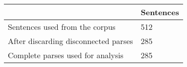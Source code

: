 	\begin{tabular}{|l|l|}
		\hline
	 & Sentences \\ 
		\hline
		Sentences used from the corpus & 512\\ 
		\hline
		After discarding disconnected parses & 285\\ 
		\hline
		Complete parses used for analysis & 285\\ 
		\hline
	\end{tabular}
